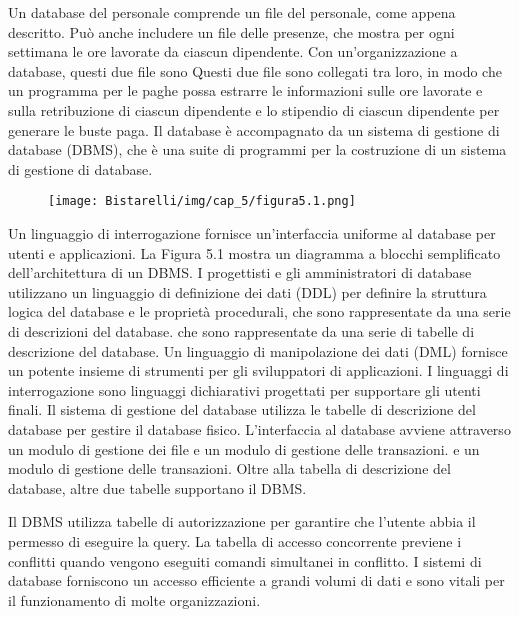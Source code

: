 \singlespacing

Un database del personale comprende un file del personale, come appena descritto. Può anche includere un file delle presenze, che mostra per ogni settimana le ore lavorate da ciascun dipendente. Con un'organizzazione a database, questi due file sono Questi due file sono collegati tra loro, in modo che un programma per le paghe possa estrarre le informazioni sulle ore lavorate e sulla retribuzione di ciascun dipendente e lo stipendio di ciascun dipendente per generare le buste paga. Il database è accompagnato da un sistema di gestione di database (DBMS), che è una suite di programmi per la costruzione di un sistema di gestione di database.

\singlespacing

\begin{figure}[H]
	\centering
    \texttt{[image: Bistarelli/img/cap\_5/figura5.1.png]}
\end{figure}


Un linguaggio di interrogazione fornisce un'interfaccia uniforme al database per utenti e applicazioni.
La Figura 5.1 mostra un diagramma a blocchi semplificato dell'architettura di un DBMS. I progettisti e gli amministratori di database utilizzano un linguaggio di definizione dei dati (DDL) per definire la struttura logica del database e le proprietà procedurali, che sono rappresentate da una serie di descrizioni del database.
che sono rappresentate da una serie di tabelle di descrizione del database. Un linguaggio di manipolazione dei dati (DML) fornisce un potente insieme di strumenti per gli sviluppatori di applicazioni. I linguaggi di interrogazione sono
linguaggi dichiarativi progettati per supportare gli utenti finali. Il sistema di gestione del database utilizza le tabelle di descrizione del database per gestire il database fisico.
L'interfaccia al database avviene attraverso un modulo di gestione dei file e un modulo di gestione delle transazioni.
e un modulo di gestione delle transazioni. Oltre alla tabella di descrizione del database, altre due tabelle supportano il DBMS.

\singlespacing

Il DBMS utilizza tabelle di autorizzazione per garantire che l'utente abbia il permesso di eseguire la query. La tabella di accesso concorrente previene i conflitti quando vengono eseguiti comandi simultanei in conflitto. I sistemi di database forniscono un accesso efficiente a grandi volumi di dati e sono vitali per il funzionamento di molte organizzazioni. 
